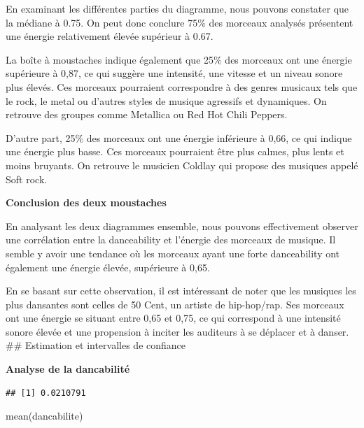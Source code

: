 \documentclass[
]{article}
\newenvironment{Shaded}{\begin{snugshade}}{\end{snugshade}}
\newcommand{\FunctionTok}[1]{\textcolor[rgb]{0.00,0.00,0.00}{#1}}
\newcommand{\NormalTok}[1]{#1}
\newcommand{\OtherTok}[1]{\textcolor[rgb]{0.56,0.35,0.01}{#1}}
\newcommand{\SpecialCharTok}[1]{\textcolor[rgb]{0.00,0.00,0.00}{#1}}
\begin{document}
En examinant les différentes parties du diagramme, nous pouvons
constater que la médiane à 0.75. On peut donc conclure 75\% des morceaux
analysés présentent une énergie relativement élevée supérieur à 0.67.

La boîte à moustaches indique également que 25\% des morceaux ont une
énergie supérieure à 0,87, ce qui suggère une intensité, une vitesse et
un niveau sonore plus élevés. Ces morceaux pourraient correspondre à des
genres musicaux tels que le rock, le metal ou d'autres styles de musique
agressifs et dynamiques. On retrouve des groupes comme Metallica ou Red
Hot Chili Peppers.

D'autre part, 25\% des morceaux ont une énergie inférieure à 0,66, ce
qui indique une énergie plus basse. Ces morceaux pourraient être plus
calmes, plus lents et moins bruyants. On retrouve le musicien Coldlay
qui propose des musiques appelé Soft rock.

\textbf{Conclusion des deux moustaches}

En analysant les deux diagrammes ensemble, nous pouvons effectivement
observer une corrélation entre la danceability et l'énergie des morceaux
de musique. Il semble y avoir une tendance où les morceaux ayant une
forte danceability ont également une énergie élevée, supérieure à 0,65.

En se basant sur cette observation, il est intéressant de noter que les
musiques les plus dansantes sont celles de 50 Cent, un artiste de
hip-hop/rap. Ses morceaux ont une énergie se situant entre 0,65 et 0,75,
ce qui correspond à une intensité sonore élevée et une propension à
inciter les auditeurs à se déplacer et à danser. \#\# Estimation et
intervalles de confiance

\textbf{Analyse de la dancabilité}

\begin{Shaded}
\end{Shaded}

\begin{verbatim}
## [1] 0.0210791
\end{verbatim}

\begin{Shaded}
\begin{Highlighting}[]
\FunctionTok{mean}\NormalTok{(dancabilite)}
\end{Highlighting}
\end{Shaded}
\end{document}
